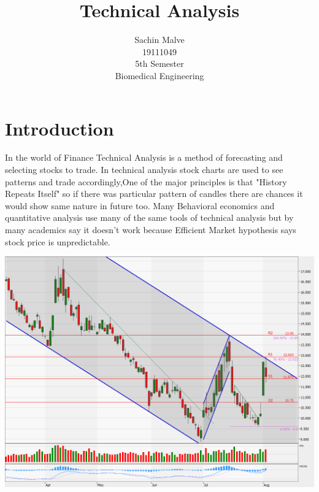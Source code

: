 \documentclass{article}
\begin{document}
\title{\vspace{-5cm}Technical Analysis  }


\author{Sachin Malve \\
	19111049 \\
 	5th Semester \\ 
	Biomedical Engineering\\
	}

\maketitle 
 \hrulefill

\section{Introduction}
 In the world of Finance Technical Analysis is a method of forecasting and selecting stocks to trade. In technical analysis stock charts are used to see patterns and trade accordingly,One of the major principles is that "History Repeats Itself" so if there was particular pattern of candles there are chances it would show same nature in future too. Many Behavioral economics and quantitative analysis use many of the same tools of technical analysis but by many academics say it doesn't work because Efficient Market hypothesis says stock price is unpredictable.

 \includegraphics[scale=.30]{Image-2019-08-05-16-25-37} 
 
\end{document}
